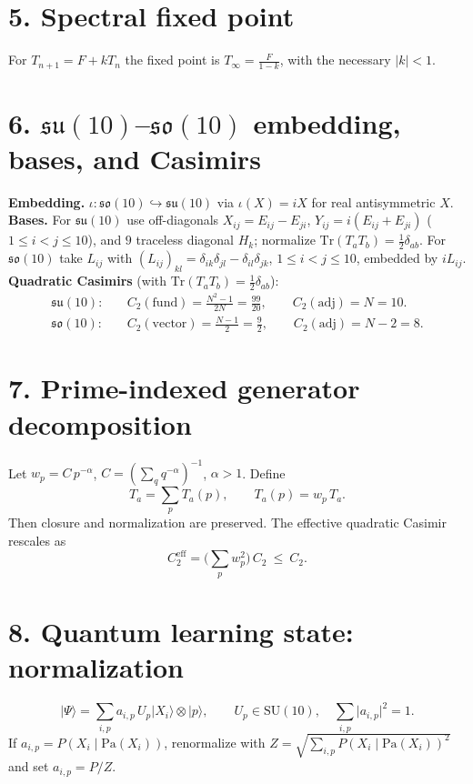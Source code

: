 \documentclass[11pt]{article}
\begin{document}
\section*{5. Spectral fixed point}
For $T_{n+1}=F+kT_n$ the fixed point is $T_{\infty}=\tfrac{F}{1-k}$, with the necessary $|k|<1$.

\section*{6. $\mathfrak{su}(10)$--$\mathfrak{so}(10)$ embedding, bases, and Casimirs}
\textbf{Embedding.} $\iota:\mathfrak{so}(10)\hookrightarrow\mathfrak{su}(10)$ via $\iota(X)=iX$ for real antisymmetric $X$.\\[3pt]
\textbf{Bases.} For $\mathfrak{su}(10)$ use off-diagonals $X_{ij}=E_{ij}-E_{ji}$, $Y_{ij}=i(E_{ij}+E_{ji})$ ($1\le i<j\le10$),
and $9$ traceless diagonal $H_k$; normalize $\mathrm{Tr}(T_a T_b)=\tfrac12\delta_{ab}$.
For $\mathfrak{so}(10)$ take $L_{ij}$ with $(L_{ij})_{kl}=\delta_{ik}\delta_{jl}-\delta_{il}\delta_{jk}$, $1\le i<j\le10$,
embedded by $iL_{ij}$.\\[3pt]
\textbf{Quadratic Casimirs} (with $\mathrm{Tr}(T_aT_b)=\tfrac12\delta_{ab}$):
\begin{align*}
\mathfrak{su}(10):\quad &C_2(\text{fund})=\frac{N^2-1}{2N}=\frac{99}{20},\qquad C_2(\text{adj})=N=10.\\
\mathfrak{so}(10):\quad &C_2(\text{vector})=\frac{N-1}{2}=\frac{9}{2},\qquad C_2(\text{adj})=N-2=8.
\end{align*}

\section*{7. Prime-indexed generator decomposition}
Let $w_p=C\,p^{-\alpha}$, $C=(\sum_q q^{-\alpha})^{-1}$, $\alpha>1$. Define
\begin{equation*}
T_a=\sum_{p} T_a(p),\qquad T_a(p)=w_p\,T_a.
\end{equation*}
Then closure and normalization are preserved. The effective quadratic Casimir rescales as
\begin{equation*}
C_2^{\mathrm{eff}}=\big(\sum_p w_p^2\big)\,C_2\ \le\ C_2.
\end{equation*}

\section*{8. Quantum learning state: normalization}
\begin{equation*}
\lvert\Psi\rangle=\sum_{i,p} a_{i,p}\,U_p\lvert X_i\rangle\otimes\lvert p\rangle,\qquad U_p\in \mathrm{SU}(10),\quad
\sum_{i,p}\lvert a_{i,p}\rvert^2=1.
\end{equation*}
If $a_{i,p}=P(X_i\mid\mathrm{Pa}(X_i))$, renormalize with $Z=\sqrt{\sum_{i,p}P(X_i\mid\mathrm{Pa}(X_i))^2}$ and set $a_{i,p}=P/Z$.
\end{document}
